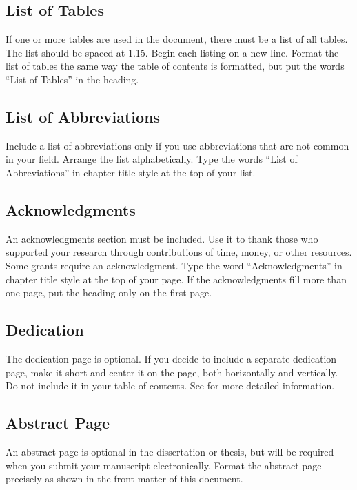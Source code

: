 \subsection{List of Tables}

If one or more tables are used in the document, there must be a list of all tables.
The list should be spaced at 1.15.
Begin each listing on a new line.
Format the list of tables the same way the table of contents is formatted, but put the words ``List of Tables'' in the heading.

\subsection{List of Abbreviations}

Include a list of abbreviations only if you use abbreviations that are not common in your field.
Arrange the list alphabetically.
Type the words ``List of Abbreviations'' in chapter title style at the top of your list.

\subsection{Acknowledgments}

An acknowledgments section must be included.
Use it to thank those who supported your research through contributions of time, money, or other resources.
Some grants require an acknowledgment.
Type the word ``Acknowledgments'' in chapter title style at the top of your page.
If the acknowledgments fill more than one page, put the heading only on the first page.

\subsection{Dedication}

The dedication page is optional.
If you decide to include a separate dedication page, make it short and center it on the page, both horizontally and vertically.
Do not include it in your table of contents.
See  for more detailed information.

\subsection{Abstract Page}

An abstract page is optional in the dissertation or thesis, but will be required when you submit your manuscript electronically.
Format the abstract page precisely as shown in the front matter of this document.

